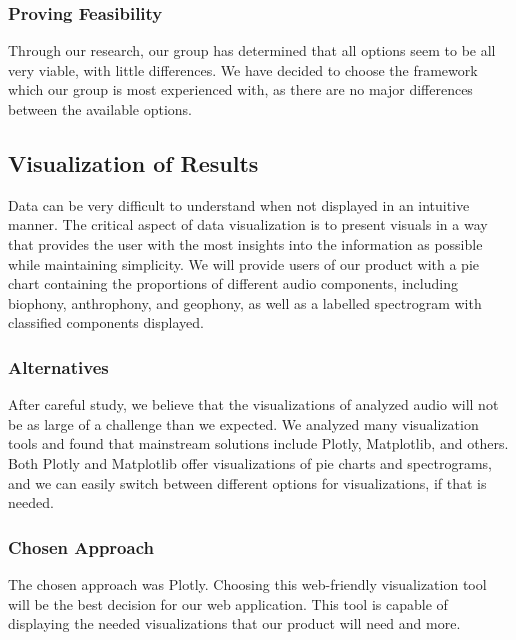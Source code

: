 \documentclass[12pt,journal,compsoc]{IEEEtran}
\newenvironment{subs}
  {\adjustwidth{1em}{0pt}}
  {\endadjustwidth}
\begin{document}
\begin{subs}
\begin{subs}
\subsubsection{Proving Feasibility}
Through our research, our group has determined that all options seem to be all very viable, with little differences. We have decided to choose the framework which our group is most experienced with, as there are no major differences between the available options.
\end{subs}

\subsection{Visualization of Results}
Data can be very difficult to understand when not displayed in an intuitive manner. The critical aspect of data visualization is to present visuals in a way that provides the user with the most insights into the information as possible while maintaining simplicity. We will provide users of our product with a pie chart containing the proportions of different audio components, including biophony, anthrophony, and geophony, as well as a labelled spectrogram with classified components displayed.

\begin{subs}
\subsubsection{Alternatives}
After careful study, we believe that the visualizations of analyzed audio will not be as large of a challenge than we expected. We analyzed many visualization tools and found that mainstream solutions include Plotly, Matplotlib, and others. Both Plotly and Matplotlib offer visualizations of pie charts and spectrograms, and we can easily switch between different options for visualizations, if that is needed.

\subsubsection{Chosen Approach}
The chosen approach was Plotly. Choosing this web-friendly visualization tool will be the best decision for our web application. This tool is capable of displaying the needed visualizations that our product will need and more.


\end{subs}
\end{subs}
\end{document}

